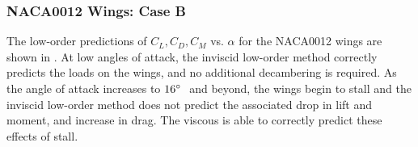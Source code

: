 \subsubsection{NACA0012 Wings: Case B}
The low-order predictions of $C_L, C_D, C_M$ vs. $\alpha$ for the NACA0012 wings are shown in
.
At low angles of attack, the inviscid low-order method correctly predicts the loads on the wings, and no additional decambering is required. As the angle of attack increases to $16^\circ ~{}$ and beyond, the wings begin to stall and the inviscid low-order method does not predict the associated drop in lift and moment, and increase in drag. The viscous \methodname is able to correctly predict these effects of stall.





